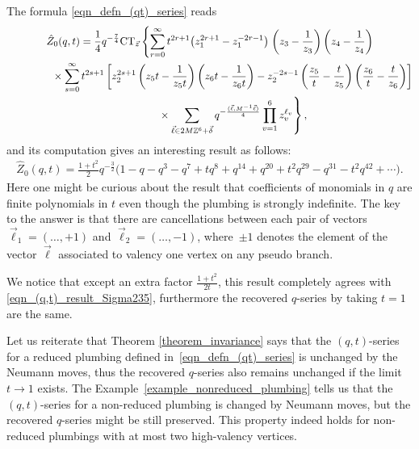\documentclass[pdftex]{sigma}
\numberwithin{equation}{section}
\begin{document}
\begin{Example}
	The formula \eqref{eqn_defn_(qt)_series} reads
	\begin{gather*}
\hat{Z}_0(q,t)=\frac{1}{4}q^{-\frac{7}{4}}\text{CT}_{\vec{z}}\left\{\sum_{r=0}^{\infty}t^{2r+1}\big(z_1^{2r+1}-z_1^{-2r-1}\big)\right.
\left(z_3-\frac{1}{z_3}\right)\left(z_4-\frac{1}{z_4}\right)\\
\hphantom{\hat{Z}_0(q,t)=}{}
\times \sum_{s=0}^{\infty}t^{2s+1}\left[z_2^{2s+1}\left(z_5 t-\frac{1}{z_5 t}\right)\left(z_6 t-\frac{1}{z_6 t}\right)-z_2^{-2s-1}\left(\frac{z_5}{t}-\frac{t}{z_5}\right)\left(\frac{z_6}{t}-\frac{t}{z_6}\right)\right]\\
\left.
\hphantom{\hat{Z}_0(q,t)=}{} \times\sum_{\vec{\ell}\in 2M\mathbb{Z}^6+\vec{\delta}}q^{-\frac{(\vec{\ell},M^{-1}\vec{\ell})}{4}}\prod_{v=1}^{6}z_v^{\ell_v}\right\},
	\end{gather*}
	and its computation gives an interesting result as follows:
	\begin{gather*}
		\hat{Z}_0(q,t)=\frac{1+t^2}{2}q^{-\frac{3}{2}}\big(1 - {q} - q^{3} - q^{7} + t q^{8} + q^{14} + q^{20} + t^2 q^{29} - q^{31} - t^2 q^{42} +\cdots\big).
	\end{gather*}
	Here one might be curious about the result that coefficients of monomials in $ q $ are finite polynomials in $ t $ even though the plumbing is strongly indefinite. The key to the answer is that there are cancellations between each pair of vectors $ \vec{\ell}_1=(\dots, +1) $ and $ \vec{\ell}_2=(\dots, -1) $, where~$ \pm 1 $ denotes the element of the vector $ \vec{\ell} $ associated to valency one vertex on any pseudo branch.
	
	We notice that except an extra factor $ \frac{1+t^2}{2t} $, this result completely agrees with \eqref{eqn_(q,t)_result_Sigma235}, furthermore the recovered $ q $-series by taking $ t=1 $ are the same.
\end{Example}

Let us reiterate that Theorem \ref{theorem_invariance} says that the $ (q,t) $-series for a reduced plumbing defined in~\eqref{eqn_defn_(qt)_series} is unchanged by the Neumann moves, thus the recovered $ q $-series also remains unchanged if the limit $ t\rightarrow 1 $ exists. The Example~\ref{example_nonreduced_plumbing} tells us that the $ (q,t) $-series for a non-reduced plumbing is changed by Neumann moves, but the recovered $ q $-series might be still preserved. This property indeed holds for non-reduced plumbings with at most two high-valency vertices.
\end{document}
